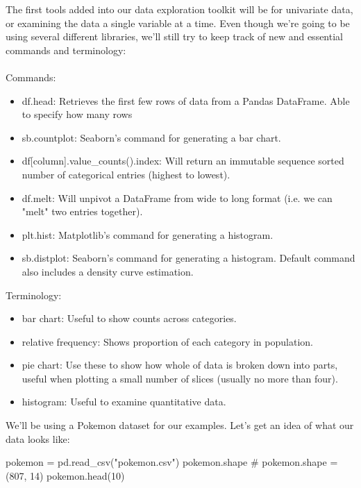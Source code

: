 The first tools added into our data exploration toolkit will be for univariate data, or examining the data a single variable at a time. Even though we're going to be using several different libraries, we'll still try to keep track of new and essential commands and terminology:
\\\\

Commands:
\begin{itemize}
	\item df.head: Retrieves the first few rows of data from a Pandas DataFrame. Able to specify how many rows
	\item sb.countplot: Seaborn's command for generating a bar chart.
	\item df[column].value\_counts().index: Will return an immutable sequence sorted number of categorical entries (highest to lowest).
	\item df.melt: Will unpivot a DataFrame from wide to long format (i.e. we can "melt" two entries together).
	\item plt.hist: Matplotlib's command for generating a histogram.
	\item sb.distplot: Seaborn's command for generating a histogram. Default command also includes a density curve estimation.
\end{itemize}

Terminology:
\begin{itemize}
	\item bar chart: Useful to show counts across categories.
	\item relative frequency: Shows proportion of each category in population.
	\item pie chart: Use these to show how whole of data is broken down into parts, useful when plotting a small number of slices (usually no more than four).
	\item histogram: Useful to examine quantitative data.
\end{itemize}

We'll be using a Pokemon dataset for our examples. Let's get an idea of what our data looks like:

\begin{python}
	pokemon = pd.read_csv("pokemon.csv")
	pokemon.shape
	# pokemon.shape = (807, 14)
	pokemon.head(10)
\end{python}

